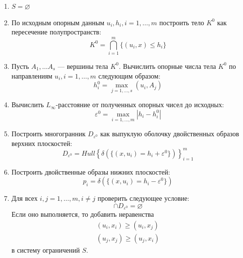 \documentclass[a4paper, 10pt]{article}
\theoremstyle{definition}
\theoremstyle{plain}
\theoremstyle{plain}
\begin{document}
\begin{enumerate}
 \item $S = \varnothing$
 \item По исходным опорным данным $u_{i}, h_{i}, i = 1, \ldots, m$
 построить тело $K^{0}$ как пересечение полупространств:
 \begin{equation}
 \label{equation:naive-body}
  K^{0} = \bigcap \limits_{i = 1}^{m} \{(u_{i}, x) \leq h_{i}\}
 \end{equation}
 \item Пусть $A_{1}, \ldots A_{s}$ --- вершины тела $K^{0}$. Вычислить опорные
 числа тела $K^{0}$ по направлениям $u_{i}, i = 1, \ldots, m$ следующим образом:
 \begin{equation*}
  h^{0}_{i} = \max \limits_{j = 1, \ldots, s} (u_{i}, A_{j})
 \end{equation*}
 \item Вычислить $L_{\infty}$-расстояние от полученных опорных чисел до
 исходных:
 \begin{equation*}
  \varepsilon^{0} = \max \limits_{i = 1, \ldots, m} |h_{i} - h^{0}_{i}|
 \end{equation*}
 \item Построить многогранник $D_{\varepsilon^{0}}$ как выпуклую оболочку
 двойственных образов верхних плоскостей:
 \begin{equation*}
  D_{\varepsilon^{0}} =
  Hull \left\{
  \delta(\{(x, u_{i}) = h_{i} + \varepsilon^{0}\})
  \right\}_{i = 1}^{m}
 \end{equation*}
 \item Построить двойственные образы нижних плоскостей:
 \begin{equation*}
  p_{i} = \delta(\{(x, u_{i}) = h_{i} - \varepsilon^{0}\})
 \end{equation*}
 \item Для всех $i, j = 1, \ldots, m, i \neq j$ проверить следующее условие:
 \begin{equation*}
  [p_{i}, p_{j}] \cap D_{\varepsilon^{0}} = \varnothing
 \end{equation*}
 Если оно выполняется, то добавить неравенства
 \begin{equation*}
 \begin{split}
  (u_{i}, x_{i}) \geq (u_{i}, x_{j}) \\
  (u_{j}, x_{j}) \geq (u_{j}, x_{i})
 \end{split}
 \end{equation*}
 в систему ограничений $S$.
\end{enumerate}
\end{document}
